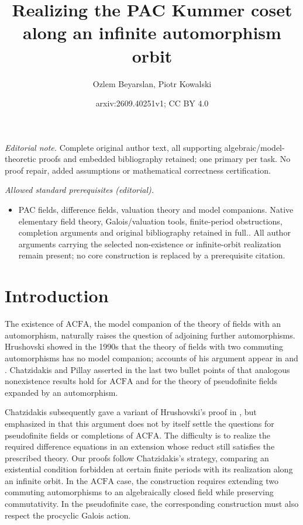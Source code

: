 \documentclass[10pt,a4paper]{amsart}
\title{Realizing the PAC Kummer coset along an infinite automorphism orbit}
\author{Ozlem Beyarslan, Piotr Kowalski}
\date{arxiv:2609.40251v1; CC BY 4.0}
\theoremstyle{definition}
\newcommand{\ACFA}{\mathrm{ACFA}}
\begin{document}
\maketitle
\noindent\textit{Editorial note.} Complete original author text, all supporting algebraic/model-theoretic proofs and embedded bibliography retained; one primary per task. No proof repair, added assumptions or mathematical correctness certification.\par\medskip
\noindent\textit{Allowed standard prerequisites (editorial).}\begin{itemize}
\item PAC fields, difference fields, valuation theory and model companions. Native elementary field theory, Galois/valuation tools, finite-period obstructions, completion arguments and original bibliography retained in full.. All author arguments carrying the selected non-existence or infinite-orbit realization remain present; no core construction is replaced by a prerequisite citation.
\end{itemize}\medskip
\section{Introduction}\label{sec:introduction}

The existence of $\ACFA$, the model companion of the theory of
fields with an automorphism, naturally raises the question of
adjoining further automorphisms. Hrushovski showed in the 1990s that the theory of fields
with two commuting automorphisms has no model companion;
accounts of his argument appear in
\cite[Section~3]{KikyoSurvey} and
\cite[Section~1.11]{Survey}. 
Chatzidakis and Pillay asserted in the last two bullet points
of \cite[Section~3.11]{CP} that analogous nonexistence results
hold for $\ACFA$ and for the theory of pseudofinite fields
expanded by an automorphism.

Chatzidakis subsequently gave a variant of Hrushovski's proof
in \cite[Section~1.11]{Survey}, but emphasized in
\cite[Remark~1.12]{Survey} that this argument does not by itself
settle the questions for pseudofinite fields or completions of
$\ACFA$. The difficulty is to realize the required difference
equations in an extension whose reduct still satisfies the
prescribed theory. Our proofs follow Chatzidakis's strategy, comparing an
existential condition forbidden at certain finite periods with
its realization along an infinite orbit.
 In the $\ACFA$ case, the construction requires
extending two commuting automorphisms to an algebraically closed
field while preserving commutativity. In the pseudofinite case,
the corresponding construction must also respect the procyclic
Galois action.
\end{document}
